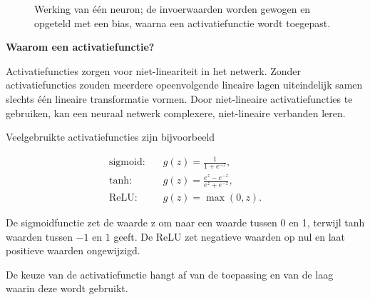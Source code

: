\documentclass{ximera}
\begin{document}
\begin{definition}
\begin{figure}[ht]

\caption{Werking van één neuron; de invoerwaarden worden
gewogen en opgeteld met een bias, waarna een activatiefunctie wordt toegepast.}
\label{fig:single_neuron}
\end{figure}
\end{definition}

\begin{remark} \textbf{Waarom een activatiefunctie?}

Activatiefuncties zorgen voor niet-lineariteit in het netwerk. Zonder activatiefuncties zouden meerdere opeenvolgende lineaire lagen uiteindelijk samen slechts één lineaire transformatie vormen. Door niet-lineaire activatiefuncties te gebruiken, kan een neuraal netwerk complexere, niet-lineaire verbanden leren.

Veelgebruikte activatiefuncties zijn bijvoorbeeld

\[
\begin{aligned}
\text{sigmoid:}\quad
&g(z)=\frac{1}{1+e^{-z}},\\[2mm]
\text{tanh:}\quad
&g(z)=\frac{e^z-e^{-z}}{e^z+e^{-z}},\\[2mm]
\text{ReLU:}\quad
&g(z)=\max(0,z).
\end{aligned}
\]

De sigmoidfunctie zet de waarde z om naar een waarde tussen 0 en 1, terwijl tanh waarden tussen $ -1$ en $1$ geeft. De ReLU zet negatieve waarden op nul en laat positieve waarden ongewijzigd.

De keuze van de activatiefunctie hangt af van de toepassing en van de laag waarin deze wordt gebruikt.
\end{remark}
\end{document}
